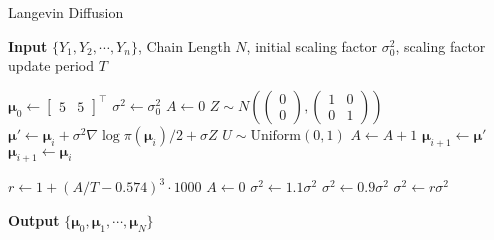 \documentclass[12pt]{article}
\begin{document}
\begin{algorithm}
	\caption{Langevin Diffusion}
	\hspace*{\algorithmicindent} \textbf{Input}  $\{Y_1, Y_2, \cdots, Y_n \}$, Chain Length $N$, initial scaling factor $\sigma_0^2$, scaling factor update period $T$ 
	\begin{algorithmic}[1]
		\State $\bm{\mu}_0 \gets \begin{bmatrix}5 & 5\end{bmatrix}^\top$
		\State $\sigma^2 \gets \sigma_0^2$
		\State $A \gets 0$ 
		\State $Z\sim N\left(\begin{pmatrix}0 \\ 0\end{pmatrix}, \begin{pmatrix}1 & 0 \\ 0 & 1\end{pmatrix} \right)$
		\State $\bm{\mu}' \gets \bm{\mu}_i + \sigma^2 \nabla \log \pi(\bm{\mu}_i)/2 + \sigma Z$
		\State $U\sim \text{Uniform}(0, 1)$
		\State $A\gets A+1$
		\State $\bm{\mu}_{i+1}\gets \bm{\mu}'$
		\Else
		\State $\bm{\mu}_{i+1}\gets \bm{\mu}_{i}$
		\EndIf
		
		 
			\State $r\gets 1+(A/T - 0.574)^3 \cdot 1000$
			\State $A\gets 0$
				\State $\sigma^2 \gets 1.1\sigma^2$
				\State $\sigma^2 \gets 0.9\sigma^2$
			\Else
				\State $\sigma^2 \gets r \sigma^2$
			\EndIf
		\EndIf
		\EndFor
	\end{algorithmic}
	\hspace*{\algorithmicindent} \textbf{Output} $\{ \bm{\mu}_0, \bm{\mu}_1, \cdots, \bm{\mu}_N \}$
\end{algorithm}
\end{document}
